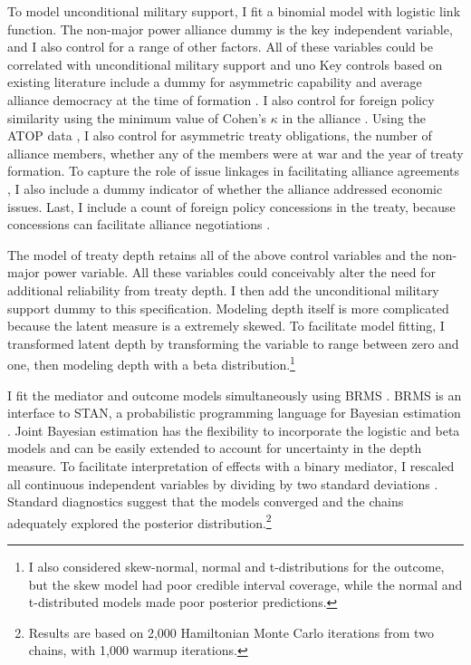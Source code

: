 \documentclass[12pt]{article}
\begin{document}
To model unconditional military support, I fit a binomial model with logistic link function. 
The non-major power alliance dummy is the key independent variable, and I also control for a range of other factors.
All of these variables could be correlated with unconditional military support and uno
Key controls based on existing literature include a dummy for asymmetric capability \citep{Mattes2012} and average alliance democracy at the time of formation \citep{Chibaetal2015}. 
I also control for foreign policy similarity \citep{Benson2012} using the minimum value of Cohen's $\kappa$ in the alliance \citep{Hage2011}.
Using the ATOP data \citep{Leedsetal2002}, I also control for asymmetric treaty obligations, the number of alliance members, whether any of the members were at war and the year of treaty formation. 
To capture the role of issue linkages in facilitating alliance agreements \citep{Poast2012, Poast2013}, I also include a dummy indicator of whether the alliance addressed economic issues.  
Last, I include a count of foreign policy concessions in the treaty, because concessions can facilitate alliance negotiations \citep{Johnson2015}. 


The model of treaty depth retains all of the above control variables and the non-major power variable. 
All these variables could conceivably alter the need for additional reliability from treaty depth. 
I then add the unconditional military support dummy to this specification. 
Modeling depth itself is more complicated because the latent measure is a extremely skewed.
To facilitate model fitting, I transformed latent depth by transforming the variable to range between zero and one, then modeling depth with a beta distribution.\footnote{I also considered skew-normal, normal and t-distributions for the outcome, but the skew model had poor credible interval coverage, while the normal and t-distributed models made poor posterior predictions.}


I fit the mediator and outcome models simultaneously using BRMS \citep{Buerkner2017}. 
BRMS is an interface to STAN, a probabilistic programming language for Bayesian estimation \citep{Carpenteretal2016}.
Joint Bayesian estimation has the flexibility to incorporate the logistic and beta models and can be easily extended to account for uncertainty in the depth measure. 
To facilitate interpretation of effects with a binary mediator, I rescaled all continuous independent variables by dividing by two standard deviations \citep{Gelman2008}. 
Standard diagnostics suggest that the models converged and the chains adequately explored the posterior distribution.\footnote{Results are based on 2,000 Hamiltonian Monte Carlo iterations from two chains, with 1,000 warmup iterations.} 
\end{document}
